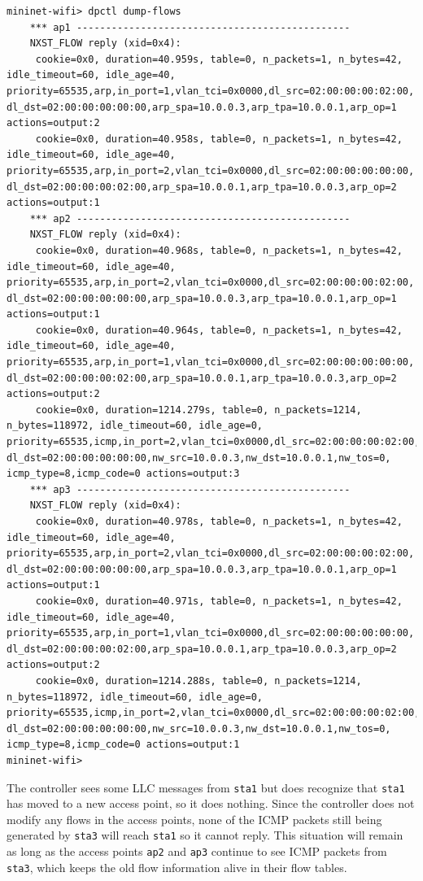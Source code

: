 \begin{verbatim}
mininet-wifi> dpctl dump-flows
    *** ap1 -----------------------------------------------
    NXST_FLOW reply (xid=0x4):
     cookie=0x0, duration=40.959s, table=0, n_packets=1, n_bytes=42, idle_timeout=60, idle_age=40, priority=65535,arp,in_port=1,vlan_tci=0x0000,dl_src=02:00:00:00:02:00, dl_dst=02:00:00:00:00:00,arp_spa=10.0.0.3,arp_tpa=10.0.0.1,arp_op=1 actions=output:2
     cookie=0x0, duration=40.958s, table=0, n_packets=1, n_bytes=42, idle_timeout=60, idle_age=40, priority=65535,arp,in_port=2,vlan_tci=0x0000,dl_src=02:00:00:00:00:00, dl_dst=02:00:00:00:02:00,arp_spa=10.0.0.1,arp_tpa=10.0.0.3,arp_op=2 actions=output:1
    *** ap2 -----------------------------------------------
    NXST_FLOW reply (xid=0x4):
     cookie=0x0, duration=40.968s, table=0, n_packets=1, n_bytes=42, idle_timeout=60, idle_age=40, priority=65535,arp,in_port=2,vlan_tci=0x0000,dl_src=02:00:00:00:02:00, dl_dst=02:00:00:00:00:00,arp_spa=10.0.0.3,arp_tpa=10.0.0.1,arp_op=1 actions=output:1
     cookie=0x0, duration=40.964s, table=0, n_packets=1, n_bytes=42, idle_timeout=60, idle_age=40, priority=65535,arp,in_port=1,vlan_tci=0x0000,dl_src=02:00:00:00:00:00, dl_dst=02:00:00:00:02:00,arp_spa=10.0.0.1,arp_tpa=10.0.0.3,arp_op=2 actions=output:2
     cookie=0x0, duration=1214.279s, table=0, n_packets=1214, n_bytes=118972, idle_timeout=60, idle_age=0, priority=65535,icmp,in_port=2,vlan_tci=0x0000,dl_src=02:00:00:00:02:00, dl_dst=02:00:00:00:00:00,nw_src=10.0.0.3,nw_dst=10.0.0.1,nw_tos=0, icmp_type=8,icmp_code=0 actions=output:3
    *** ap3 -----------------------------------------------
    NXST_FLOW reply (xid=0x4):
     cookie=0x0, duration=40.978s, table=0, n_packets=1, n_bytes=42, idle_timeout=60, idle_age=40, priority=65535,arp,in_port=2,vlan_tci=0x0000,dl_src=02:00:00:00:02:00, dl_dst=02:00:00:00:00:00,arp_spa=10.0.0.3,arp_tpa=10.0.0.1,arp_op=1 actions=output:1
     cookie=0x0, duration=40.971s, table=0, n_packets=1, n_bytes=42, idle_timeout=60, idle_age=40, priority=65535,arp,in_port=1,vlan_tci=0x0000,dl_src=02:00:00:00:00:00, dl_dst=02:00:00:00:02:00,arp_spa=10.0.0.1,arp_tpa=10.0.0.3,arp_op=2 actions=output:2
     cookie=0x0, duration=1214.288s, table=0, n_packets=1214, n_bytes=118972, idle_timeout=60, idle_age=0, priority=65535,icmp,in_port=2,vlan_tci=0x0000,dl_src=02:00:00:00:02:00, dl_dst=02:00:00:00:00:00,nw_src=10.0.0.3,nw_dst=10.0.0.1,nw_tos=0, icmp_type=8,icmp_code=0 actions=output:1
mininet-wifi>
\end{verbatim}    

The controller sees some LLC messages from \texttt{sta1} but does recognize that \texttt{sta1} has moved to a new access point, so it does nothing. Since the controller does not modify any flows in the access points, none of the ICMP packets still being generated by \texttt{sta3} will reach \texttt{sta1} so it cannot reply. This situation will remain as long as the access points \texttt{ap2} and \texttt{ap3} continue to see ICMP packets from \texttt{sta3}, which keeps the old flow information alive in their flow tables.

